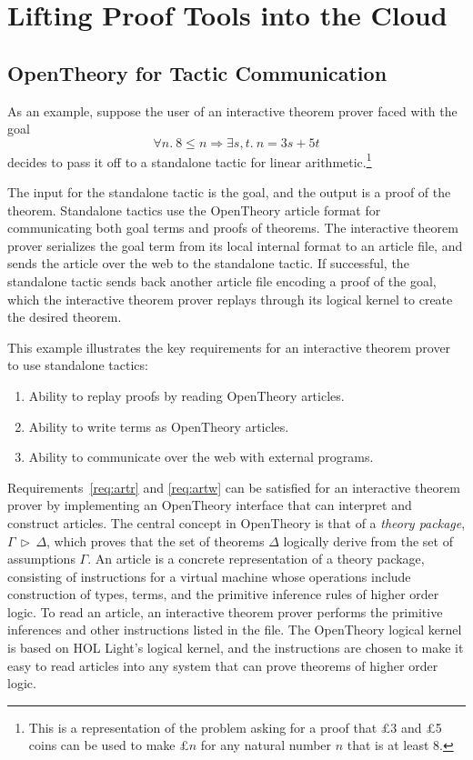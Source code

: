 \documentclass{llncs}
\newcommand{\OpenTheory}{OpenTheory\xspace}
\newcommand{\theory}[2]{{#1}\,\triangleright\,{#2}}
\begin{document}
\section{Lifting Proof Tools into the Cloud}
\label{sec:implementation}

\subsection{\OpenTheory for Tactic Communication}

As an example, suppose the user of an interactive theorem prover faced with the goal
\[
\forall n.\ 8\le n\Rightarrow\exists s,t.\ n = 3s + 5t
\]
decides to pass it off to a standalone tactic for linear arithmetic.\footnote{This is a representation of the problem asking for a proof that \pounds 3 and \pounds 5 coins can be used to make \pounds $n$ for any natural number $n$ that is at least 8.}

The input for the standalone tactic is the goal, and the output is a proof of the theorem.  Standalone tactics use the \OpenTheory article format for communicating both goal terms and proofs of theorems.  The interactive theorem prover serializes the goal term from its local internal format to an article file, and sends the article over the web to the standalone tactic. If successful, the standalone tactic sends back another article file encoding a proof of the goal, which the interactive theorem prover replays through its logical kernel to create the desired theorem.

This example illustrates the key requirements for an interactive theorem prover to use standalone tactics:
\begin{enumerate}
\item\label{req:artr} Ability to replay proofs by reading \OpenTheory articles.

\item\label{req:artw} Ability to write terms as \OpenTheory articles.

\item\label{req:comm} Ability to communicate over the web with external programs.
\end{enumerate}

Requirements~\ref{req:artr} and \ref{req:artw} can be satisfied for an interactive theorem prover by implementing an \OpenTheory interface that can interpret and construct articles.
The central concept in \OpenTheory is that of a \emph{theory package}, $\theory{\Gamma}{\Delta}$, which proves that the set of theorems $\Delta$ logically derive from the set of assumptions $\Gamma$. An article is a concrete representation of a theory package, consisting of instructions for a virtual machine whose operations include construction of types, terms, and the primitive inference rules of higher order logic. To read an article, an interactive theorem prover performs the primitive inferences and other instructions listed in the file. The \OpenTheory logical kernel is based on HOL Light's logical kernel, and the instructions are chosen to make it easy to read articles into any system that can prove theorems of higher order logic.
\end{document}
